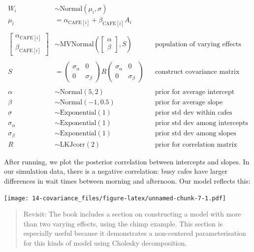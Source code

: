 \documentclass[
]{book}
\begin{document}
\[
\begin{aligned}
W_i &\sim \text{Normal}(\mu_i, \sigma) \\
\mu_i &= \alpha_{\text{CAFE}[i]} + \beta_{\text{CAFE}[i]}A_i \\
\\
\begin{bmatrix}
\alpha_{\text{CAFE}[i]} \\
\beta_{\text{CAFE}[i]}
\end{bmatrix}
&\sim \text{MVNormal}\left( 
\begin{bmatrix}
\alpha \\
\beta
\end{bmatrix}
, S
\right) && \text{population of varying effects}\\
\\
S &= \begin{pmatrix}
\sigma_\alpha & 0  \\
 0 & \sigma_\beta
\end{pmatrix}
R
\begin{pmatrix}
\sigma_\alpha & 0  \\
 0 & \sigma_\beta
\end{pmatrix} && \text{construct covariance matrix} \\
\\
\alpha &\sim \text{Normal}(5,2) && \text{prior for average intercept}\\
\beta &\sim \text{Normal}(-1,0.5) && \text{prior for average slope} \\
\sigma &\sim \text{Exponential}(1) && \text{prior std dev within cafes} \\
\sigma_\alpha &\sim \text{Exponential}(1) && \text{prior std dev among intercepts}\\
\sigma_\beta &\sim \text{Exponential}(1) && \text{prior std dev among slopes}\\
R &\sim \text{LKJcorr}(2) && \text{prior for correlation matrix}
\end{aligned}
\]

After running, we plot the posterior correlation between intercepts and slopes. In our simulation data, there is a negative correlation: busy cafes have larger differences in wait times between morning and afternoon. Our model reflects this:

\texttt{[image: 14-covariance\_files/figure-latex/unnamed-chunk-7-1.pdf]}

\begin{quote}
Revisit: The book includes a section on constructing a model with more than two varying effects, using the chimp example. This section is especially useful because it demonstrates a non-centered parameterisation for this kinds of model using Cholesky decomposition.
\end{quote}
\end{document}
